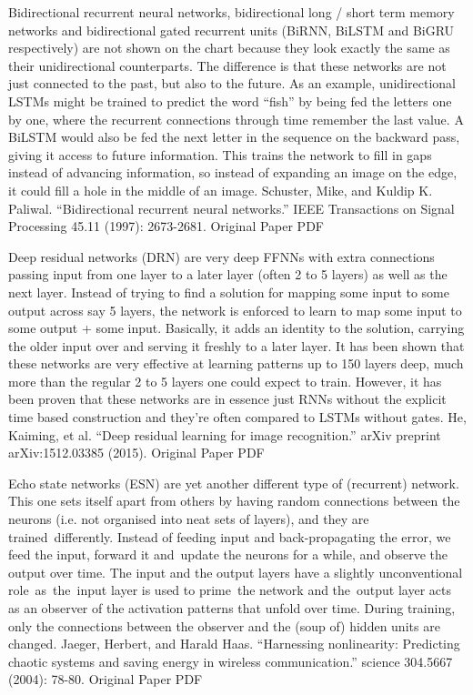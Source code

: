 \documentclass[11pt,a4paper,oneside]{ctexbook}
\begin{document}
Bidirectional recurrent neural networks, bidirectional long / short term memory networks and bidirectional gated recurrent units (BiRNN, BiLSTM and BiGRU respectively) are not shown on the chart because they look exactly the same as their unidirectional counterparts. The difference is that these networks are not just connected to the past, but also to the future. As an example, unidirectional LSTMs might be trained to predict the word “fish” by being fed the letters one by one, where the recurrent connections through time remember the last value. A BiLSTM would also be fed the next letter in the sequence on the backward pass, giving it access to future information. This trains the network to fill in gaps instead of advancing information, so instead of expanding an image on the edge, it could fill a hole in the middle of an image.
Schuster, Mike, and Kuldip K. Paliwal. “Bidirectional recurrent neural networks.” IEEE Transactions on Signal Processing 45.11 (1997): 2673-2681.
Original Paper PDF


Deep residual networks (DRN) are very deep FFNNs with extra connections passing input from one layer to a later layer (often 2 to 5 layers) as well as the next layer. Instead of trying to find a solution for mapping some input to some output across say 5 layers, the network is enforced to learn to map some input to some output + some input. Basically, it adds an identity to the solution, carrying the older input over and serving it freshly to a later layer. It has been shown that these networks are very effective at learning patterns up to 150 layers deep, much more than the regular 2 to 5 layers one could expect to train. However, it has been proven that these networks are in essence just RNNs without the explicit time based construction and they’re often compared to LSTMs without gates.
He, Kaiming, et al. “Deep residual learning for image recognition.” arXiv preprint arXiv:1512.03385 (2015).
Original Paper PDF


Echo state networks (ESN) are yet another different type of (recurrent) network. This one sets itself apart from others by having random connections between the neurons (i.e. not organised into neat sets of layers), and they are trained differently. Instead of feeding input and back-propagating the error, we feed the input, forward it and update the neurons for a while, and observe the output over time. The input and the output layers have a slightly unconventional role as the input layer is used to prime the network and the output layer acts as an observer of the activation patterns that unfold over time. During training, only the connections between the observer and the (soup of) hidden units are changed.
Jaeger, Herbert, and Harald Haas. “Harnessing nonlinearity: Predicting chaotic systems and saving energy in wireless communication.” science 304.5667 (2004): 78-80.
Original Paper PDF
\end{document}
